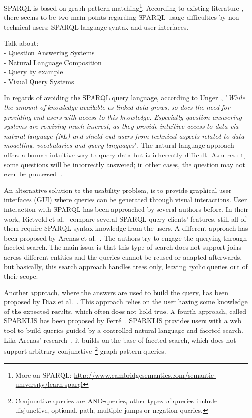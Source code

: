 SPARQL is based on graph pattern matching\footnote{More on SPARQL: \url{http://www.cambridgesemantics.com/semantic-university/learn-sparql}}. 
According to existing literature \cite{Unger2014,Lehmann2014,Unger2015,Rietveld2016,Arenas2016,Ferre2016}, there seems to be two main points regarding SPARQL usage difficulties by non-technical users: 
SPARQL language syntax and user interfaces.


Talk about:\\
- Question Answering Systems\\
- Natural Language Composition\\
- Query by example\\
- Visual Query Systems

In regards of avoiding the SPARQL query language, according to Unger~\cite{Unger2014}, "\textit{While the amount of knowledge available as linked data grows, so does the need for providing end users with access to this knowledge. Especially question answering systems are receiving much interest, as they provide intuitive access to data via natural language (NL) and shield end users from technical aspects related to data modelling, vocabularies and query languages}". The natural language approach offers a human-intuitive way to query data but is inherently difficult. As a result, some questions will be incorrectly answered; in other cases, the question may not even be processed~\cite{Unger2015}. 

An alternative solution to the usability problem, is to provide graphical user interfaces (GUI) where queries can be generated through visual interactions. 
User interaction with SPARQL has been approached by several authors before. 
In their work, Rietveld et al.~\cite{Rietveld2016} compare several SPARQL query clients’ features, still all of them require SPARQL syntax knowledge from the users. 
A different approach has been proposed by Arenas et al.~\cite{Arenas2016}. 
The authors try to engage the querying through faceted search. 
The main issue is that this type of search does not support joins across different entities and the queries cannot be reused or adapted afterwards, but basically, this search approach handles trees only, leaving cyclic queries out of their scope. 

Another approach, where the answers are used to build the query, has been proposed by Diaz et al.~\cite{Diaz2016}. 
This approach relies on the user having some knowledge of the expected results, which often does not hold true. 
A fourth approach, called SPARKLIS has been proposed by Ferré~\cite{Ferre2016}. 
SPARKLIS provides users with a web tool to build queries guided by a controlled natural language and faceted search. 
Like Arenas' research~\cite{Arenas2016}, it builds on the base of faceted search, which does not support arbitrary conjunctive~\footnote{Conjunctive queries are AND-queries, other types of queries include disjunctive, optional, path, multiple jumps or negation queries.} graph pattern queries. 

